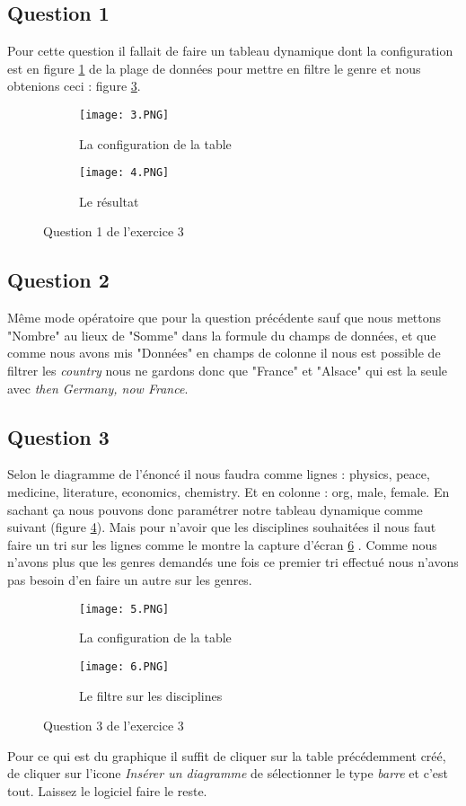 \documentclass[10pt,a4paper]{article}
\begin{document}
\subsection{Question 1}
Pour cette question il fallait de faire un tableau dynamique dont la configuration est en figure \ref{fig4a} de la plage de données pour mettre en filtre le genre et nous obtenions ceci : figure \ref{fig4b}.
\begin{figure}[!h]
\begin{subfigure}{.4\textwidth}
  \centering
  \texttt{[image: 3.PNG]}
  \caption{La configuration de la table}
  \label{fig4a}
\end{subfigure}
\begin{subfigure}{.6\textwidth}
  \centering
  \texttt{[image: 4.PNG]}
  \caption{Le résultat}
  \label{fig4b}
\end{subfigure}
\caption{Question 1 de l’exercice 3}
\end{figure}
\subsection{Question 2}
Même mode opératoire que pour la question précédente sauf que nous mettons "Nombre" au lieux de "Somme" dans la formule du champs de données, et que comme nous avons mis "Données" en champs de colonne il nous est possible de filtrer les \textit{country} nous ne gardons donc que "France" et "Alsace" qui est la seule avec \textit{then Germany, now France}. 
\subsection{Question 3}
Selon le diagramme de l'énoncé il nous faudra comme lignes : physics, peace, medicine, literature, economics, chemistry. Et en colonne : org, male, female. En sachant ça nous pouvons donc paramétrer notre tableau dynamique comme suivant (figure \ref{5a}). Mais pour n'avoir que les disciplines souhaitées il nous faut faire un tri sur les lignes comme le montre la capture d'écran \ref{5b} . Comme nous n'avons plus que les genres demandés une fois ce premier tri effectué nous n'avons pas besoin d'en faire un autre sur les genres.
\begin{figure}[!h]
\begin{subfigure}{.6\textwidth}
  \centering
  \texttt{[image: 5.PNG]}
  \caption{La configuration de la table}
  \label{5a}
\end{subfigure}
\begin{subfigure}{.4\textwidth}
  \centering
  \texttt{[image: 6.PNG]}
  \caption{Le filtre sur les disciplines}
  \label{5b}
\end{subfigure}
\caption{Question 3 de l'exercice 3}
\end{figure}
Pour ce qui est du graphique il suffit de cliquer sur la table précédemment créé, de cliquer sur l'icone \textit{Insérer un diagramme} de sélectionner le type \textit{barre} et c'est tout. Laissez le logiciel faire le reste. 
\end{document}
